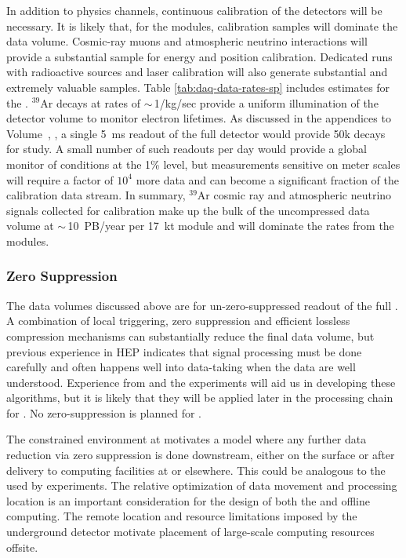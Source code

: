 In addition to physics channels, continuous calibration of the detectors will be necessary.  It is likely that, for the  modules, calibration samples will  dominate the data volume. Cosmic-ray muons and atmospheric neutrino interactions will provide a substantial sample for energy and position calibration.  Dedicated runs with radioactive sources and laser calibration will also generate substantial and extremely valuable samples. Table \ref{tab:daq-data-rates-sp} includes estimates for the %
. 
$^{39}$Ar decays at rates of $\sim\,$1/kg/sec provide a uniform illumination of the detector volume to monitor electron lifetimes. As discussed in the appendices to %
Volume~\volnumberphysics{}, \voltitlephysics{},  a single \SI{5}{ms} readout of the full detector would provide 50k decays for study.  A small number of such readouts per day would provide a global monitor of conditions at the 1\% level, but measurements sensitive on meter scales will require a factor of $10^4$ more data and can become a significant fraction of the calibration data stream. In summary, $^{39}$Ar cosmic ray and atmospheric neutrino signals collected for calibration make up the bulk of the uncompressed  data volume at $\sim\,$\SI{10}{PB/year} per \SI{17}{kt} module and will dominate the rates from the  modules.  


\subsubsection{Zero Suppression}

The data volumes discussed above are for un-zero-suppressed readout of the full . A combination of local triggering, zero suppression and  efficient lossless compression mechanisms can substantially reduce the final data volume, but previous experience in HEP indicates that signal processing must be done carefully and often happens well into data-taking when the data are well understood. 
Experience from   and the  experiments will aid us in developing these algorithms, but it is likely that they will be applied later in the processing chain for .  No zero-suppression is planned for .

The constrained environment at  motivates a model where any further data reduction via zero suppression is done downstream, either on the surface or after delivery to computing facilities at  or elsewhere. This could be analogous to the  used by  experiments.  The relative  optimization of data movement and processing location is an important consideration for the design of both the  and offline computing. %
The remote location and resource limitations imposed by the underground detector motivate placement of large-scale computing resources offsite. 


